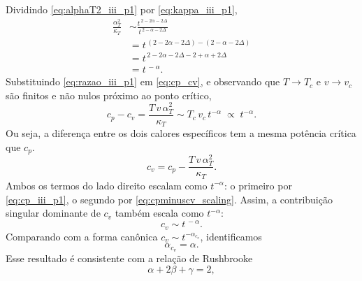 \documentclass[11pt,a4paper]{article}
\begin{document}
%
Dividindo \eqref{eq:alphaT2_iii_p1} por \eqref{eq:kappa_iii_p1},
%
\begin{align}
    \frac{\alpha_T^{2}}{\kappa_T}
    &\sim
    \frac{t^{\,2-2\alpha-2\Delta}}{t^{\,2-\alpha-2\Delta}} \nonumber\\
    &=
    t^{\,(2-2\alpha-2\Delta)-(2-\alpha-2\Delta)} \nonumber\\
    &=
    t^{\,2-2\alpha-2\Delta-2+\alpha+2\Delta} \nonumber\\
    &=
    t^{\,-\alpha}.
    \label{eq:razao_iii_p1}
\end{align}
%
Substituindo \eqref{eq:razao_iii_p1} em \eqref{eq:cp_cv}, e observando que
\(T\to T_c\) e \(v\to v_c\) são finitos e não nulos próximo ao ponto crítico,
%
\begin{equation}
    c_p-c_v
    =
    \frac{T\,v\,\alpha_T^{2}}{\kappa_T}
    \sim
    T_c\,v_c\,
    t^{-\alpha}
    \;\propto\;
    t^{-\alpha}.
    \label{eq:cpminuscv_scaling}
\end{equation}
%
Ou seja, a diferença entre os dois calores específicos tem a mesma potência
crítica que \(c_p\).
%
\begin{equation}
    c_v
    =
    c_p
    -
    \frac{T\,v\,\alpha_T^{2}}{\kappa_T}.
    \label{eq:cv_from_cp_p1}
\end{equation}
%
Ambos os termos do lado direito escalam como \(t^{-\alpha}\): o primeiro por
\eqref{eq:cp_iii_p1}, o segundo por \eqref{eq:cpminuscv_scaling}. Assim, a
contribuição singular dominante de \(c_v\) também escala como \(t^{-\alpha}\):
%
\begin{equation}
    \boxed{
    c_v
    \sim
    t^{\,-\alpha}.
    }
    \label{eq:cv_scaling}
\end{equation}
%
Comparando com a forma canônica \(c_v\sim t^{-\alpha_{c_v}}\), identificamos
%
\begin{equation}
    \boxed{
    \alpha_{c_v}=\alpha.
    }
    \label{eq:expoente_cv_p1}
\end{equation}
%
Esse resultado é
consistente com a relação de Rushbrooke
%
\begin{equation}
    \alpha+2\beta+\gamma=2,
\end{equation}
%
\end{document}
